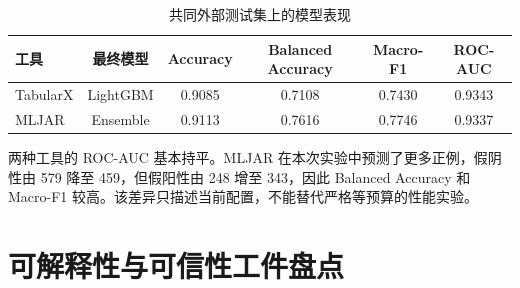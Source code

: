 \documentclass[degree=bachelor,language=chinese,fontset=fandol]{thuthesis}
\begin{document}
\begin{table}[htbp]
  \centering
  \caption{共同外部测试集上的模型表现}
  \begin{tabular}{lccccc}
    \toprule
    工具 & 最终模型 & Accuracy & Balanced Accuracy & Macro-F1 & ROC-AUC \\
    \midrule
    TabularX & LightGBM & 0.9085 & 0.7108 & 0.7430 & 0.9343 \\
    MLJAR & Ensemble & 0.9113 & 0.7616 & 0.7746 & 0.9337 \\
    \bottomrule
  \end{tabular}
\end{table}

两种工具的 ROC-AUC 基本持平。MLJAR 在本次实验中预测了更多正例，假阴性由 579 降至 459，但假阳性由 248 增至 343，因此 Balanced Accuracy 和 Macro-F1 较高。该差异只描述当前配置，不能替代严格等预算的性能实验。

\section{可解释性与可信性工件盘点}
\end{document}
